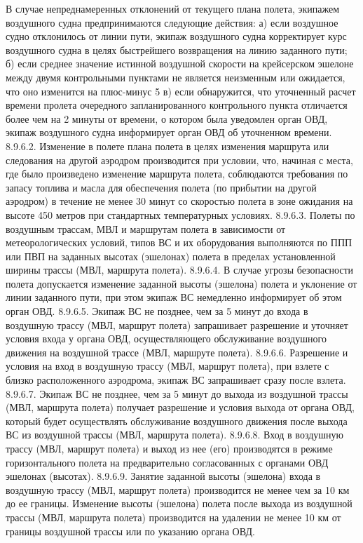 В случае непреднамеренных отклонений от текущего плана полета, экипажем воздушного судна предпринимаются следующие действия: 
а)	если воздушное судно отклонилось от линии пути, экипаж воздушного судна корректирует курс воздушного судна в целях быстрейшего возвращения на линию заданного пути; 
б)	если среднее значение истинной воздушной скорости на крейсерском эшелоне между двумя контрольными пунктами не является неизменным или ожидается, что оно изменится на плюс-минус 5%
в)	если обнаружится, что уточненный расчет времени пролета очередного запланированного контрольного пункта отличается более чем на 2 минуты от времени, о котором была уведомлен орган ОВД, экипаж воздушного судна информирует орган ОВД об уточненном времени. 
8.9.6.2. Изменение в полете плана полета в целях изменения маршрута или следования на другой аэродром производится при условии, что, начиная с места, где было произведено изменение маршрута полета, соблюдаются требования по запасу топлива и масла для обеспечения полета (по прибытии на другой аэродром) в течение не менее 30 минут со скоростью полета в зоне ожидания на высоте 450 метров при стандартных температурных условиях. 
8.9.6.3. Полеты по воздушным трассам, МВЛ и маршрутам полета в зависимости от метеорологических условий, типов ВС и их оборудования выполняются по ППП или ПВП на заданных высотах (эшелонах) полета в пределах установленной ширины трассы (МВЛ, маршрута полета).
8.9.6.4. В случае угрозы безопасности полета допускается изменение заданной высоты (эшелона) полета и уклонение от линии заданного пути, при этом экипаж ВС немедленно информирует об этом орган ОВД.
8.9.6.5. Экипаж ВС не позднее, чем за 5 минут до входа в воздушную трассу (МВЛ, маршрут полета) запрашивает разрешение и уточняет условия входа у органа ОВД, осуществляющего обслуживание воздушного движения на воздушной трассе (МВЛ, маршруте полета).
8.9.6.6. Разрешение и условия на вход в воздушную трассу (МВЛ, маршрут полета), при взлете с близко расположенного аэродрома, экипаж ВС запрашивает сразу после взлета.
8.9.6.7. Экипаж ВС не позднее, чем за 5 минут до выхода из воздушной трассы (МВЛ, маршрута полета) получает разрешение и условия выхода от органа ОВД, который будет осуществлять обслуживание воздушного движения после выхода ВС из воздушной трассы (МВЛ, маршрута полета).
8.9.6.8. Вход в воздушную трассу (МВЛ, маршрут полета) и выход из нее (его) производятся в режиме горизонтального полета на предварительно согласованных с органами ОВД эшелонах (высотах).
8.9.6.9. Занятие заданной высоты (эшелона) входа в воздушную трассу (МВЛ, маршрут полета) производится не менее чем за 10 км до ее границы. Изменение высоты (эшелона) полета после выхода из воздушной трассы (МВЛ, маршрута полета) производится на удалении не менее 10 км от границы воздушной трассы или по указанию органа ОВД.
